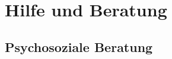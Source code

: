 \documentclass[12pt, a4paper]{article}
\newif\ifinfo
\begin{document}
\newpage
\section{Hilfe und Beratung}
\ifinfo
	\subsection{Don't panic! -- Erste Hilfe: fsi}
	
\else
	
\fi

%	
%	

\ifinfo
	\subsection{Ansprechpartner nach Studiengängen}
	

	\subsection{Prüfungssekretariate}
	

\fi
\subsection{Psychosoziale Beratung}





%

%
\end{document}
